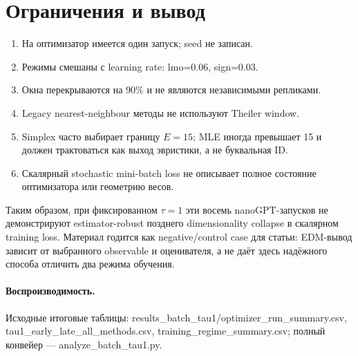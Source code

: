 \documentclass[11pt,a4paper]{article}
\newcommand{\code}[1]{{\fontencoding{T1}\selectfont\ttfamily #1}}
\begin{document}
\section{Ограничения и вывод}

\begin{enumerate}
\item На оптимизатор имеется один запуск; seed не записан.
\item Режимы смешаны с learning rate: \code{lmo}=0.06, \code{sign}=0.03.
\item Окна перекрываются на 90\% и не являются независимыми репликами.
\item Legacy nearest-neighbour методы не используют Theiler window.
\item Simplex часто выбирает границу $E=15$; MLE иногда превышает 15 и
      должен трактоваться как выход эвристики, а не буквальная ID.
\item Скалярный stochastic mini-batch loss не описывает полное состояние
      оптимизатора или геометрию весов.
\end{enumerate}

Таким образом, при фиксированном $\tau=1$ эти восемь nanoGPT-запусков не
демонстрируют estimator-robust позднего dimensionality collapse в скалярном
training loss. Материал годится как negative/control case для статьи:
EDM-вывод зависит от выбранного observable и оценивателя, а не даёт здесь
надёжного способа отличить два режима обучения.

\paragraph{Воспроизводимость.}
Исходные итоговые таблицы: \code{results\_batch\_tau1/optimizer\_run\_summary.csv},
\code{tau1\_early\_late\_all\_methods.csv},
\code{training\_regime\_summary.csv}; полный конвейер ---
\code{analyze\_batch\_tau1.py}.
\end{document}

